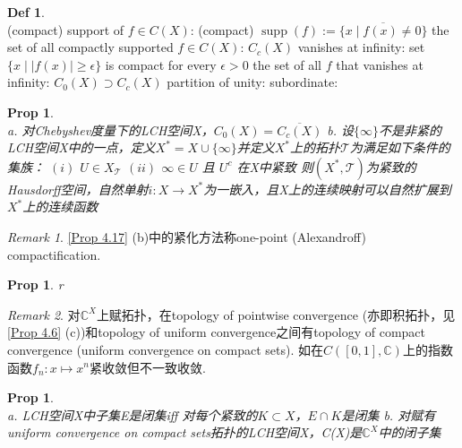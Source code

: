 \documentclass[hidelinks]{article}
\theoremstyle{definition}
\newtheorem*{defin}{Def}
\theoremstyle{plain}
\newtheorem{proposition}[theorem]{Prop}
\theoremstyle{remark}
\newtheorem*{remark}{Remark}
\DeclareMathOperator\supp{supp}
\begin{document}
\begin{defin}~\\
(compact) support of $f\in C(X)$: (compact) $\supp(f):=\overline{\{x\mid f(x)\neq 0\}}$ \newline
\indent the set of all compactly supported $f\in C(X)$: $C_c(X)$ \newline
vanishes at infinity: set $\{x\mid |f(x)|\geq \epsilon \}$ is compact for every $\epsilon >0$\newline
\indent the set of all $f$ that vanishes at infinity: $C_0(X)\supset C_c(X)$\newline
partition of unity:  \newline
subordinate:
\end{defin}

\begin{proposition}\label{Prop 4.17}~\\
a. 对Chebyshev度量下的LCH空间X，$C_0(X)=\overline{C_c(X)}$\newline
b. 设$\{\infty\}$不是非紧的LCH空间X中的一点，定义$X^*=X\cup \{\infty\}$并定义$X^*$上的拓扑$\mathscr{T}$为满足如下条件的集族：\newline
\indent $(i)$ $U\in X_\mathscr{T}$ \newline
\indent $(ii)$ $\infty \in U$ 且 $U^c$ 在X中紧致 \newline
则$(X^*,\mathscr{T})$为紧致的Hausdorff空间，自然单射$i:X\to X^*$为一嵌入，且X上的连续映射可以自然扩展到$X^*$上的连续函数
\end{proposition}

\begin{remark}
\autoref{Prop 4.17} (b)中的紧化方法称one-point (Alexandroff) compactification.
\end{remark}

\begin{proposition}
r
\end{proposition}

\begin{remark}
对$\mathbb{C}^X$上赋拓扑，在topology of pointwise convergence (亦即积拓扑，见\autoref{Prop 4.6} (c))和topology of uniform convergence之间有topology of compact convergence (uniform convergence on compact sets). 如在$C([0,1],\mathbb{C})$上的指数函数$f_n:x\mapsto x^n$紧收敛但不一致收敛.
\end{remark}

\begin{proposition}~\\
a. LCH空间X中子集E是闭集iff 对每个紧致的$K\subset X$，$E\cap K$是闭集 \newline
b. 对赋有uniform convergence on compact sets拓扑的LCH空间X，C(X)是$\mathbb{C}^X$中的闭子集
\end{proposition}
\end{document}
